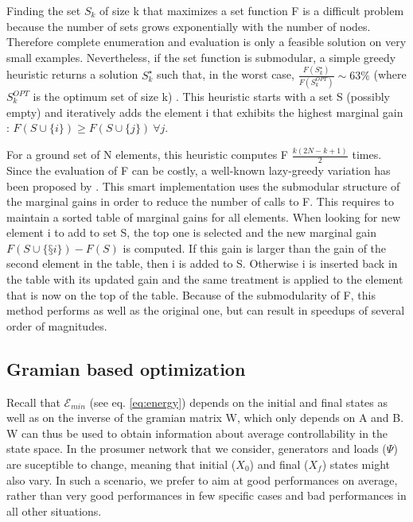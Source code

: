 \documentclass[conference]{IEEEtran}
\begin{document}
Finding the set $ S_k $ of size k that maximizes a set function F is a difficult problem because the number of sets grows exponentially with the number of nodes. Therefore complete enumeration and evaluation is only a feasible solution on very small examples. Nevertheless, if the set function is submodular, a simple greedy heuristic returns a solution $ S_k^{\star} $ such that, in the worst case, $ \frac{F(S_k^{\star})}{F(S_k^{OPT})} \sim 63\%$ (where $ S_k^{OPT}$ is the optimum set of size k) \cite{Krause2014}. This heuristic starts with a set S (possibly empty) and iteratively adds the element i that exhibits the highest marginal gain : $ F(S \cup \{i\}) \geq F(S \cup \{j\})\ \forall j $.

For a ground set of N elements, this heuristic computes F $ \frac{k(2 N - k + 1)}{2} $ times. Since the evaluation of F can be costly, a well-known lazy-greedy variation has been proposed by \cite{Minoux}. This smart implementation uses the submodular structure of the marginal gains in order to reduce the number of calls to F. This requires to maintain a sorted table of marginal gains for all elements. When looking for new element i to add to set S, the top one is selected and the new marginal gain $F(S\cup \{§i\}) - F(S)$ is computed. If this gain is larger than the  gain of the second element in the table, then i is added to S. Otherwise i is inserted back in the table with its updated gain and the same treatment is applied to the element that is now on the top of the table. Because of the submodularity of F, this method performs as well as the original one, but can result in speedups of several order of magnitudes.


\subsection{Gramian based optimization}

Recall that $\mathcal{E}_{min}$ (see eq. \ref{eq:energy}) depends on the initial and final states as well as on the inverse of the gramian matrix W, which only depends on A and B. W can thus be used to obtain information about average controllability in the state space. In the prosumer network that we consider, generators and loads ($\Psi$) are suceptible to change, meaning that initial ($X_0$) and final ($X_f$) states might also vary. In such a scenario, we prefer to aim at good performances on average, rather than very good performances in few specific cases and bad performances in all other situations.
\end{document}
